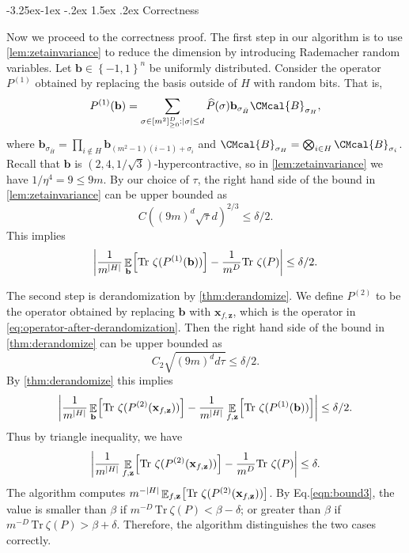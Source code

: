 \documentclass[11pt]{article}
\makeatletter
\renewcommand{\subsection}{\@startsection{subsection}{2}{\z@}%
             {-3.25ex\@plus -1ex \@minus -.2ex}%
             {1.5ex \@plus .2ex}%
             {\normalfont\large\scshape\bfseries}}
\def\B{\CMcal{B}}
\theoremstyle{plain}
\theoremstyle{definition}
\newcommand {\minusspace} {\: \! \!}
\newcommand {\Fn} [2] {\ensuremath{ #1 \minusspace \Br{ #2 } }}
\newcommand {\set} [1] {\ensuremath{ \left\lbrace #1 \right\rbrace }}
\newcommand {\br} [1] {\ensuremath{ \left( #1 \right) }}
\newcommand {\Br} [1] {\ensuremath{ \left[ #1 \right] }}
\newcommand {\ab} [1] {\ensuremath{ \left| #1 \right| }}
\DeclarePairedDelimiter{\abs}{\lvert}{\rvert}
\DeclareMathOperator*{\bigE}{\mathbb{E}}
\newcommand {\expec} [2] {\Fn{\bigE_{\substack{#1}}}{#2}}
\newcommand {\Tr} {\ensuremath{ \mathrm{Tr} }}
\newcommand{\randb}{\ensuremath{\mathbf{b}}}
\newcommand{\randz}{\ensuremath{\mathbf{z}}}
\newcommand{\randx}{\ensuremath{\mathbf{x}}}
\newcommand{\bits}[1]{\ensuremath{\set{-1,1}^{#1}}}
\newcommand{\dlbo} {\ensuremath{{D}}}
\newcommand{\dldd} {\ensuremath{{d}}}
\newcommand{\epreg} {\ensuremath{{\delta}}}
\newcommand{\epdr} {\ensuremath{\delta}}
\newcommand{\1}{\mathbb{1}} %
\makeatother
\begin{document}
\subsection{Correctness}

Now we proceed to the correctness proof.
The first step in our algorithm is to use \cref{lem:zetainvariance} to reduce the dimension by introducing 
Rademacher random variables.
Let $\randb\in\bits{n}$ be uniformly distributed.
Consider the operator $P^{(1)}$ obtained by replacing the basis outside of $H$ with random bits.
That is,
\[ P^{(1)}(\randb) = \sum_{\sigma\in[m^2]_{\ge 0}^{\dlbo}:\ab{\sigma}\le d}\widehat{P}(\sigma)\randb_{\sigma_{\bar{H}}}\B_{\sigma_H},\]
        where $\randb_{\sigma_{\bar{H}}} = \prod_{i\notin H}\randb_{(m^2-1)(i-1)+\sigma_i}$ and $\B_{\sigma_H}=\bigotimes_{i\in H}\B_{\sigma_i}$.
Recall that $\randb$ is $(2,4,1/\sqrt{3})$-hypercontractive,
so in \cref{lem:zetainvariance} we have $1/\eta^4 = 9 \le 9m$. By our choice of $\tau$, the right hand side of the bound in \cref{lem:zetainvariance} can be upper bounded as
\begin{equation}\label{eqn:bound1}
C\br{(9m)^d\sqrt{\tau}d}^{2/3}\le\epreg/2.
\end{equation}
This implies
$$\ab{\frac{1}{m^{\abs{H}}}\expec{\randb}{\Tr~\zeta(P^{(1)}(\randb))}-\frac{1}{m^\dlbo}\Tr~\zeta(P)}\le\delta/2.$$

The second step is derandomization by \cref{thm:derandomize}.
We define $P^{(2)}$ to be the operator obtained by replacing $\randb$ with $\randx_{f, \randz}$,
which is the operator in \cref{eq:operator-after-derandomization}.
Then the right hand side of the bound in \cref{thm:derandomize} can be upper bounded as
\begin{equation}\label{eqn:bound2}
C_2\sqrt{(9m)^\dldd\dldd\tau}\le\epdr/2.
\end{equation}
By \cref{thm:derandomize} this implies
$$\ab{\frac{1}{m^{\abs{H}}}\expec{\randb}{\Tr~\zeta(P^{(2)}(\randx_{f, \randz}))}-\frac{1}{m^{\abs{H}}}\expec{f, \randz}{\Tr~\zeta(P^{(1)}(\randb))}}\le\delta/2.$$
Thus by triangle inequality, we have
\begin{equation}\label{eqn:bound3}
\ab{\frac{1}{m^{\abs{H}}}\expec{f, \randz}{\Tr~\zeta(P^{(2)}(\randx_{f, \randz}))}-\frac{1}{m^\dlbo}\Tr~\zeta(P)}\le\delta.
\end{equation}
The algorithm computes $m^{-\abs{H}}\expec{f, \randz}{\Tr~\zeta(P^{(2)}(\randx_{f, \randz}))}$. By Eq.\eqref{eqn:bound3}, the value is smaller than $\beta$  if $m^{-\dlbo}\,\Tr~\zeta(P)<\beta-\delta$; or greater than $\beta$ if $m^{-\dlbo}\,\Tr~\zeta(P)>\beta+\delta$. Therefore, the algorithm distinguishes the two cases correctly.
\end{document}
